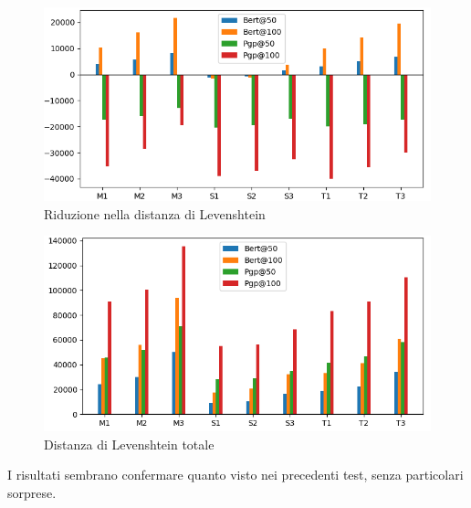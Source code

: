 \documentclass[12pt]{article}
\begin{document}
\begin{figure}[H]
\centering
\includegraphics[width=\textwidth]{immagini/lev1}
\caption{Riduzione nella distanza di Levenshtein}
\end{figure}


\begin{figure}[H]
\centering
\includegraphics[width=\textwidth]{immagini/lev2}
\caption{Distanza di Levenshtein totale}
\end{figure}

I risultati sembrano confermare quanto visto nei precedenti test, senza particolari sorprese.



\end{document}
